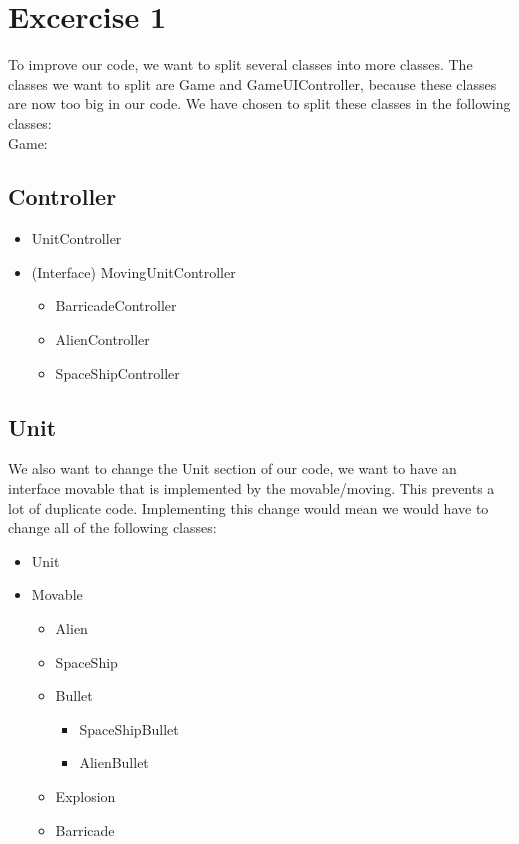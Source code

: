 \documentclass[10pt]{article}
\begin{document}
\section*{Excercise 1}
To improve our code, we want to split several classes into more classes. The classes we want to split are Game and GameUIController, because these classes are now too big in our code. We have chosen to split these classes in the following classes:\\
Game:\newline
\subsection*{Controller}
\begin{itemize}
	\item UnitController
	\item (Interface) MovingUnitController
	\begin{itemize}
	\item BarricadeController
	\item AlienController
	\item SpaceShipController
	\end{itemize}
\end{itemize}
\subsection*{Unit}
We also want to change the Unit section of our code, we want to have an interface movable that is implemented by the movable/moving. This prevents a lot of duplicate code. Implementing this change would mean we would have to change all of the following classes:
	\begin{itemize}
	\item Unit
	\item Movable
		\begin{itemize}
		\item Alien
		\item SpaceShip
		\item Bullet
		\begin{itemize}
			\item SpaceShipBullet
			\item AlienBullet
		\end{itemize}
		\item Explosion
		\item Barricade
	\end{itemize}
\end{itemize}
\end{document}
